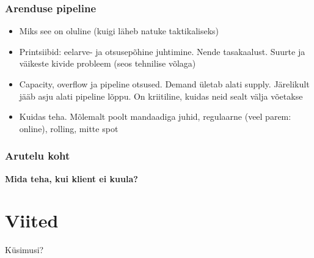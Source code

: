 \begin{frame}[fragile]
  \frametitle{Arenduse pipeline}
	\begin{itemize}
		\item Miks see on oluline (kuigi läheb natuke taktikaliseks)
		\item Printsiibid: eelarve- ja otsusepõhine juhtimine. Nende tasakaalust. Suurte ja väikeste kivide probleem (seos tehnilise võlaga)
		\item Capacity, overflow ja pipeline otsused. Demand ületab alati supply. Järelikult jääb asju alati pipeline lõppu. On kriitiline, kuidas neid sealt välja võetakse
		\item Kuidas teha. Mõlemalt poolt mandaadiga juhid, regulaarne (veel parem: online), rolling, mitte spot
	\end{itemize}
\end{frame}

\begin{frame}[fragile]
  \frametitle{Arutelu koht}
		\begin{center}
			\textbf{Mida teha, kui klient ei kuula?}
		\end{center}
\end{frame}


\section{Viited}

\begin{frame}[t,allowframebreaks,]
  	
	 

\end{frame}

\begin{frame}[plain]
	\begin{center}Küsimusi?\end{center}
\end{frame}

